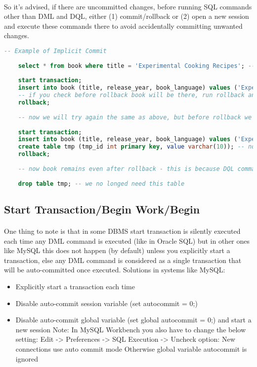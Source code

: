 \paragraph{} So it's advised, if there are uncommitted changes, before running \acs{SQL} commands other than \acs{DML} and \acs{DQL}, either (1) commit/rollback or (2) open a new session and execute these commands there to avoid accidentally committing unwanted changes.
\begin{lstlisting}[language=SQL]
	-- Example of Implicit Commit
	
	select * from book where title = 'Experimental Cooking Recipes'; -- no such book initially
	
	start transaction;
	insert into book (title, release_year, book_language) values ('Experimental Cooking Recipes', 2004, 'English');
	-- if you check before rollback book will be there, run rollback and check again, book won't be there anymore
	rollback;
	
	-- now we will try again the same as above, but before rollback we will run DQL command create table
	
	start transaction;
	insert into book (title, release_year, book_language) values ('Experimental Cooking Recipes', 2004, 'English');
	create table tmp (tmp_id int primary key, value varchar(10)); -- now before rollback run this DQL command
	rollback;
	
	-- now book remains even after rollback - this is because DQL commands like create/drop table autocommit
	
	drop table tmp; -- we no longed need this table
\end{lstlisting}
\subsection{Start Transaction/Begin Work/Begin}
\paragraph{} One thing to note is that in some \acs{DBMS} start transaction is silently executed each time any \acs{DML} command is executed (like in Oracle SQL) but in other ones like MySQL this does not happen (by default) unless you explicitly start a transaction, else any \acs{DML} command is considered as a single transaction that will be auto-committed once executed. Solutions in systems like MySQL:
\begin{itemize}
	\item Explicitly start a transaction each time
	\item Disable auto-commit session variable (set autocommit = 0;)
	\item Disable auto-commit global variable (set global autocommit = 0;) and start a new session
	\subitem Note: In MySQL Workbench you also have to change the below setting:
	\subitem Edit -> Preferences -> SQL Execution -> Uncheck option: New connections use auto commit mode
	\subitem Otherwise global variable autocommit is ignored
\end{itemize}
